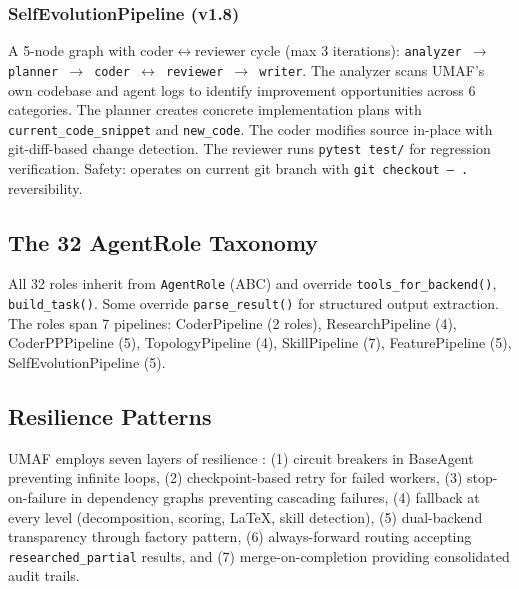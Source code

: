 \subsubsection{SelfEvolutionPipeline (v1.8)}
A 5-node graph with coder$\leftrightarrow$reviewer cycle (max 3 iterations): \texttt{analyzer $\rightarrow$ planner $\rightarrow$ coder $\leftrightarrow$ reviewer $\rightarrow$ writer}. The analyzer scans UMAF's own codebase and agent logs to identify improvement opportunities across 6 categories. The planner creates concrete implementation plans with \texttt{current\_code\_snippet} and \texttt{new\_code}. The coder modifies source in-place with git-diff-based change detection. The reviewer runs \texttt{pytest test/} for regression verification. Safety: operates on current git branch with \texttt{git checkout -- .} reversibility.

\subsection{The 32 AgentRole Taxonomy}

All 32 roles inherit from \texttt{AgentRole} (ABC) and override \texttt{tools\_for\_backend()}, \texttt{build\_task()}. Some override \texttt{parse\_result()} for structured output extraction. The roles span 7 pipelines: CoderPipeline (2 roles), ResearchPipeline (4), CoderPPPipeline (5), TopologyPipeline (4), SkillPipeline (7), FeaturePipeline (5), SelfEvolutionPipeline (5).

\subsection{Resilience Patterns}

UMAF employs seven layers of resilience \cite{releaseit}: (1) circuit breakers in BaseAgent preventing infinite loops, (2) checkpoint-based retry for failed workers, (3) stop-on-failure in dependency graphs preventing cascading failures, (4) fallback at every level (decomposition, scoring, LaTeX, skill detection), (5) dual-backend transparency through factory pattern, (6) always-forward routing accepting \texttt{researched\_partial} results, and (7) merge-on-completion providing consolidated audit trails.
